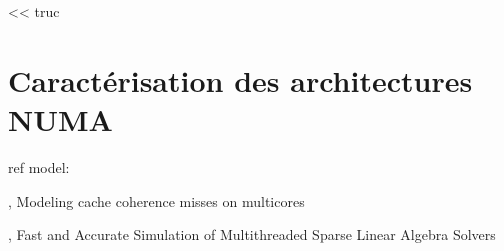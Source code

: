 
\begin{savequote}[6cm]
<< truc
\end{savequote}

\chapter{Caractérisation des architectures NUMA}\label{chap:contrib:characterization}
\chaptertoc







ref model:

\cite{Pan2014}, Modeling cache coherence misses on multicores

\cite{Stanisic2016}, Fast and Accurate Simulation of Multithreaded Sparse Linear Algebra Solvers




